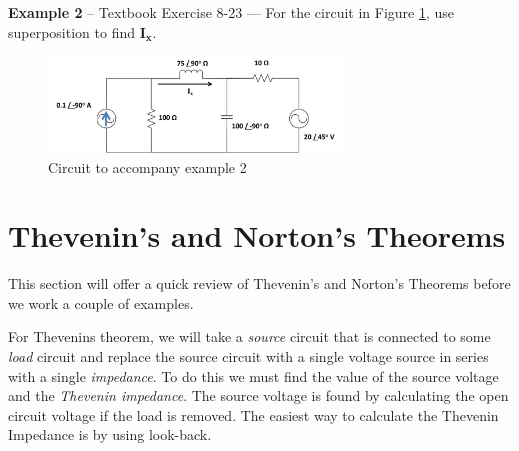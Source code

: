 \documentclass{handout}
\begin{document}
\textbf{Example 2} -- Textbook Exercise 8-23 --- For the circuit in Figure \ref{fig: Example2}, use superposition to find $\mathbf{I_x}$.
\begin{figure} [h!]
\centering
\includegraphics[width=0.7\textwidth]{Example2.jpg}
\caption{Circuit to accompany example 2}
\label{fig: Example2}
\end{figure}


\newpage
\clearpage
\pagebreak

\section{Thevenin's and Norton's Theorems}
This section will offer a quick review of Thevenin's and Norton's Theorems before we work a couple of examples.

For Thevenins theorem, we will take a {\em source} circuit that is connected to some {\em load} circuit and replace the source circuit with a single voltage source in series with a single {\em impedance}.  To do this we must find the value of the source voltage and the {\em Thevenin impedance}.  The source voltage is found by calculating the open circuit voltage if the load is removed.  The easiest way to calculate the Thevenin Impedance is by using look-back.
\end{document}

